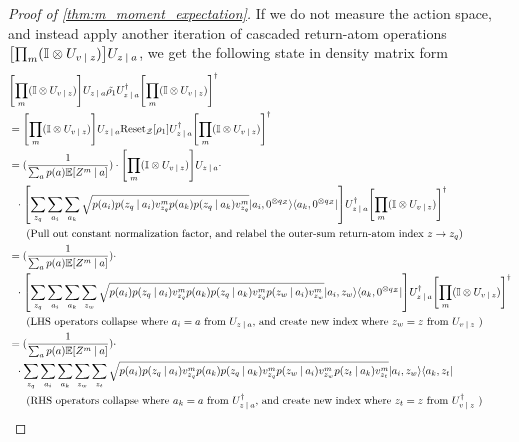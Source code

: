 \documentclass{article}
\DeclarePairedDelimiter{\bra}{\langle}{\rvert} %
\DeclarePairedDelimiter{\ket}{\lvert}{\rangle} %
\DeclarePairedDelimiter{\bparen}{[}{]} %
\newcommand{\E}{\mathbb{E}} %
\newcommand{\bfunc}[2]{#1\bparen*{#2}} %
\newcommand{\given}[1][]{\:#1\vert\:}
\begin{document}
\begin{proof}[Proof of \cref{thm:m_moment_expectation}]
If we do not measure the action space, and instead apply another iteration of cascaded return-atom operations $\bparen*{\prod_{m} (\mathbb{I} \otimes U_{v \given z})} U_{z \given a}$, we get the following state in density matrix form
% 
\begin{align}
& \bparen*{\prod_{m} (\mathbb{I} \otimes U_{v \given z})} U_{z \given a} \tilde{\rho_1} U_{z \given a}^{\dagger} {\bparen*{\prod_{m} (\mathbb{I} \otimes U_{v \given z})}}^{\dagger}
% 
\\&= \bparen*{\prod_{m} (\mathbb{I} \otimes U_{v \given z})} U_{z \given a} \bfunc{\textrm{Reset}_{\mathcal{Z}}}{\rho_1}U_{z \given a}^{\dagger} {\bparen*{\prod_{m} (\mathbb{I} \otimes U_{v \given z})}}^{\dagger}
% 
\\&= (\frac{1}{\sum_{a} p(a) \bfunc{\mathbb{E}}{Z^{m} \given a}}) \cdot \bparen*{\prod_{m} (\mathbb{I} \otimes U_{v \given z})} U_{z \given a} \cdot
\\&~~\cdot \bparen*{\sum_{z_q} \sum_{a_i} \sum_{a_k} \sqrt{p(a_i) p(z_q \given a_i) v_{z_q}^{m} p(a_k) p(z_q \given a_k) v_{z_q}^{m}} \ket{a_i,0^{\otimes q_{\mathcal{Z}}}}\bra{a_k,0^{\otimes q_{\mathcal{Z}}}}} U_{z \given a}^{\dagger} {\bparen*{\prod_{m} (\mathbb{I} \otimes U_{v \given z})}}^{\dagger}
\\&~~~~~\textrm{(Pull out constant normalization factor, and relabel the outer-sum return-atom index}~ z \to z_q \textrm{)}\nonumber
% 
\\&= (\frac{1}{\sum_{a} p(a) \bfunc{\mathbb{E}}{Z^{m} \given a}}) \cdot 
\\&~~\cdot \bparen*{\sum_{z_q} \sum_{a_i} \sum_{a_k} \sum_{z_w} \sqrt{p(a_i) p(z_q \given a_i) v_{z_q}^{m} p(a_k) p(z_q \given a_k) v_{z_q}^{m} p(z_w \given a_i) v_{z_w}^{m}} \ket{a_i, z_w}\bra{a_k, 0^{\otimes q_{\mathcal{Z}}}}} U_{z \given a}^{\dagger} {\bparen*{\prod_{m} (\mathbb{I} \otimes U_{v \given z})}}^{\dagger}
\\&~~~~~\textrm{(LHS operators collapse where}~ a_i = a ~\textrm{from}~ U_{z \given a} \textrm{, and create new index where}~ z_{w} = z ~\textrm{from}~ U_{v \given z} ~\textrm{)}\nonumber
% 
\\&= (\frac{1}{\sum_{a} p(a) \bfunc{\mathbb{E}}{Z^{m} \given a}}) \cdot 
\\&~~\cdot \sum_{z_q} \sum_{a_i} \sum_{a_k} \sum_{z_w} \sum_{z_t} \sqrt{p(a_i) p(z_q \given a_i) v_{z_q}^{m} p(a_k) p(z_q \given a_k) v_{z_q}^{m} p(z_w \given a_i) v_{z_w}^{m} p(z_t \given a_k) v_{z_t}^{m}} \ket{a_i, z_w}\bra{a_k, z_t}
\\&~~~~~\textrm{(RHS operators collapse where}~ a_k = a ~\textrm{from}~ U_{z \given a}^{\dagger} \textrm{, and create new index where}~ z_{t} = z ~\textrm{from}~ U_{v \given z}^{\dagger} ~\textrm{)}\nonumber

\end{align}
\end{proof}
\end{document}
